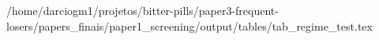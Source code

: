 /home/darciogm1/projetos/bitter-pills/paper3-frequent-losers/papers_finais/paper1_screening/output/tables/tab_regime_test.tex